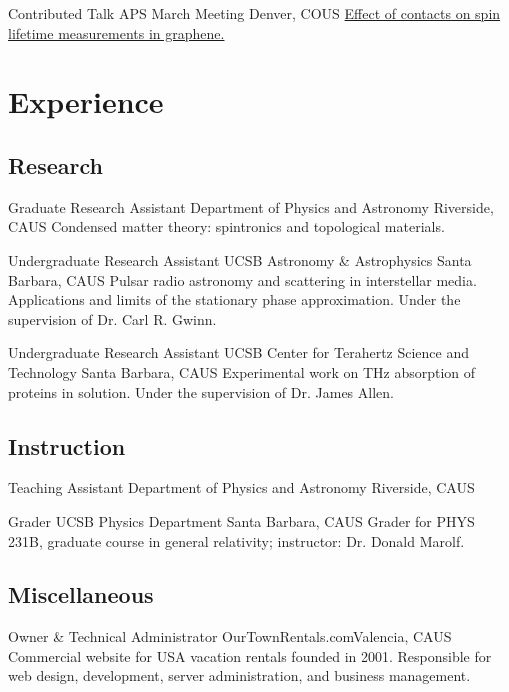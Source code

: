 \documentclass[10pt,letter]{moderncv}
\begin{document}
    {Contributed Talk}
    {APS March Meeting}
    {Denver, CO}{US}
    {\href{http://io.evansosenko.com/deck-spin-lifetime/}
      {Effect of contacts on spin lifetime measurements in graphene.}}

  \section{Experience}

  \subsection{Research}

    {Graduate Research Assistant}
    {Department of Physics and Astronomy}
    {Riverside, CA}{US}
    {Condensed matter theory: spintronics and topological materials.}

    {Undergraduate Research Assistant}
    {UCSB Astronomy \& Astrophysics}
    {Santa Barbara, CA}{US}
    {Pulsar radio astronomy and scattering in interstellar media.
      Applications and limits of the stationary phase approximation.
      Under the supervision of Dr. Carl R. Gwinn.}

    {Undergraduate Research Assistant}
    {UCSB Center for Terahertz Science and Technology}
    {Santa Barbara, CA}{US}
    {Experimental work on THz absorption of proteins in solution.
      Under the supervision  of Dr. James Allen.}

  \subsection{Instruction}

    {Teaching Assistant}
    {Department of Physics and Astronomy}
    {Riverside, CA}{US}{}

    {Grader}
    {UCSB Physics Department}
    {Santa Barbara, CA}{US}
    {Grader for PHYS 231B, graduate course in general relativity; instructor: Dr. Donald Marolf.}

  \subsection{Miscellaneous}

    {Owner \& Technical Administrator}
    {OurTownRentals.com}{Valencia, CA}{US}
    {Commercial website for USA vacation rentals founded in 2001.
      Responsible for web design, development, server administration, and business management.}
\end{document}
